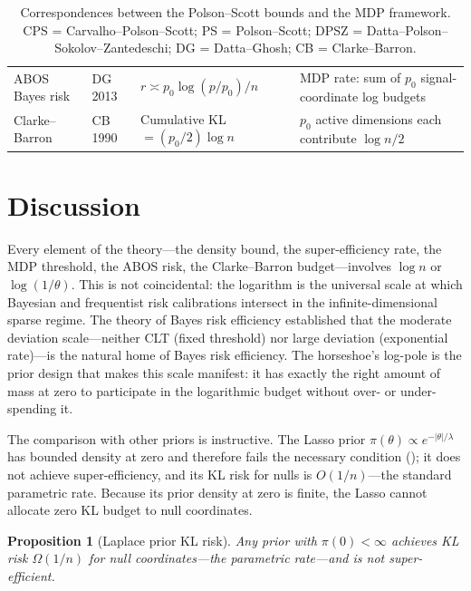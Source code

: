 \documentclass[12pt]{article}
\newtheorem{proposition}[theorem]{Proposition}
\newcommand{\abs}[1]{\lvert #1 \rvert}
\begin{document}
\begin{table}[H]
\begin{tabular}{@{}p{2.3cm}p{2.2cm}p{4.2cm}p{4.5cm}@{}}
ABOS Bayes risk &
DG 2013 &
$r \asymp p_0\log(p/p_0)/n$ &
MDP rate: sum of $p_0$ signal-coordinate log budgets \\

Clarke--Barron &
CB 1990 &
Cumulative KL $= (p_0/2)\log n$ &
$p_0$ active dimensions each contribute $\log n / 2$ \\
\bottomrule
\end{tabular}
\caption{Correspondences between the Polson--Scott bounds and the MDP framework. CPS = Carvalho--Polson--Scott; PS = Polson--Scott; DPSZ = Datta--Polson--Sokolov--Zantedeschi; DG = Datta--Ghosh; CB = Clarke--Barron.}
\label{tab:correspondences}
\end{table}


\section{Discussion}\label{sec:discussion}

Every element of the theory---the density bound, the super-efficiency rate, the MDP threshold, the ABOS risk, the Clarke--Barron budget---involves $\log n$ or $\log(1/\theta)$. This is not coincidental: the logarithm is the universal scale at which Bayesian and frequentist risk calibrations intersect in the infinite-dimensional sparse regime. The \citet{rubin1965bayes} theory of Bayes risk efficiency established that the moderate deviation scale---neither CLT (fixed threshold) nor large deviation (exponential rate)---is the natural home of Bayes risk efficiency. The horseshoe's log-pole is the prior design that makes this scale manifest: it has exactly the right amount of mass at zero to participate in the logarithmic budget without over- or under-spending it.

The comparison with other priors is instructive. The Lasso prior $\pi(\theta) \propto e^{-\abs{\theta}/\lambda}$ has bounded density at zero and therefore fails the necessary condition (); it does not achieve super-efficiency, and its KL risk for nulls is $O(1/n)$---the standard parametric rate. Because its prior density at zero is finite, the Lasso cannot allocate zero KL budget to null coordinates.

\begin{proposition}[Laplace prior KL risk]\label{prop:lasso}
Any prior with $\pi(0) < \infty$ achieves KL risk $\Omega(1/n)$ for null coordinates---the parametric rate---and is not super-efficient.
\end{proposition}
\end{document}
